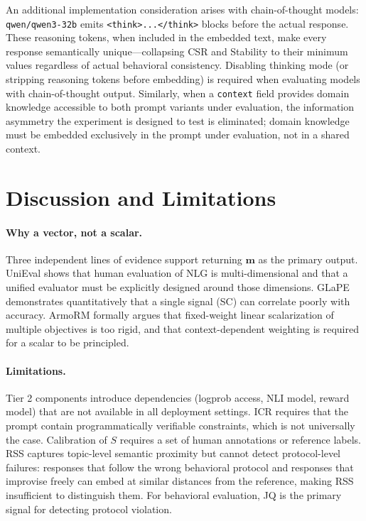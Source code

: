 \documentclass[11pt,a4paper]{article}
\begin{document}
An additional implementation consideration arises with chain-of-thought models: \texttt{qwen/qwen3-32b} emits \texttt{<think>...</think>} blocks before the actual response. These reasoning tokens, when included in the embedded text, make every response semantically unique---collapsing CSR and Stability to their minimum values regardless of actual behavioral consistency. Disabling thinking mode (or stripping reasoning tokens before embedding) is required when evaluating models with chain-of-thought output. Similarly, when a \texttt{context} field provides domain knowledge accessible to both prompt variants under evaluation, the information asymmetry the experiment is designed to test is eliminated; domain knowledge must be embedded exclusively in the prompt under evaluation, not in a shared context.

\section{Discussion and Limitations}
\label{sec:discussion}

\paragraph{Why a vector, not a scalar.}
Three independent lines of evidence support returning $\mathbf{m}$ as the primary output. UniEval \citep{unieval2022} shows that human evaluation of NLG is multi-dimensional and that a unified evaluator must be explicitly designed around those dimensions. GLaPE \citep{glape2024} demonstrates quantitatively that a single signal (SC) can correlate poorly with accuracy. ArmoRM \citep{armorm2024} formally argues that fixed-weight linear scalarization of multiple objectives is too rigid, and that context-dependent weighting is required for a scalar to be principled.

\paragraph{Limitations.}
Tier 2 components introduce dependencies (logprob access, NLI model, reward model) that are not available in all deployment settings. ICR requires that the prompt contain programmatically verifiable constraints, which is not universally the case. Calibration of $S$ requires a set of human annotations or reference labels. RSS captures topic-level semantic proximity but cannot detect protocol-level failures: responses that follow the wrong behavioral protocol and responses that improvise freely can embed at similar distances from the reference, making RSS insufficient to distinguish them. For behavioral evaluation, JQ is the primary signal for detecting protocol violation.
\end{document}
